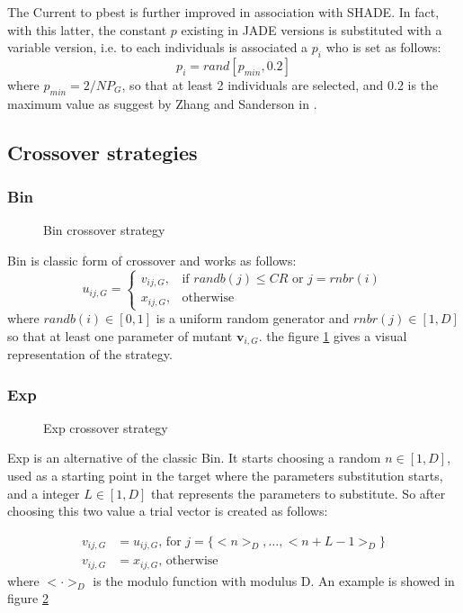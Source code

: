 The Current to pbest is further improved in association with SHADE. In fact, with this latter, the constant $p$ existing in JADE versions is substituted with a variable version, i.e. to each individuals is associated a $p_i$ who is set as follows:
\begin{equation}
p_i = rand[p_{\textit{min}}, 0.2]
\end{equation}
where $p_{\textit{min}} = 2 / \textit{NP}_G$, so that at least 2 individuals are selected, and 0.2 is the maximum value as suggest by Zhang and Sanderson in \cite{JADE:2009}.
\subsection{Crossover strategies}

\subsubsection{Bin}
\begin{figure}[h]
	\caption{Bin crossover strategy}
	\label{fig:bin-crossover}
\end{figure}
Bin is classic form of crossover and works as follows:
\begin{equation}
	u_{ij, G} = \begin{cases}
		v_{ij, G}, &\textrm{if }\textit{randb}(j) \leq \textit{CR}\textrm{ or } j = \textit{rnbr}(i)\\
		x_{ij, G}, &\textrm{otherwise}
	\end{cases}
\end{equation}
where $\textit{randb}(i) \in [0, 1]$ is a uniform random generator and $\textit{rnbr}(j) \in [1, D]$ so that at least one parameter of mutant $\textbf{v}_{i, G}$. the figure \ref{fig:bin-crossover} gives a visual representation of the strategy.
\subsubsection{Exp}
\begin{figure}[h]
	\caption{Exp crossover strategy}
	\label{fig:exp-crossover}
\end{figure}
Exp is an alternative of the classic Bin. It starts choosing a random $n \in [1, D]$, used as a starting point in the target where the parameters substitution starts, and a integer $L \in [1, D]$ that represents the parameters to substitute. So after choosing this two value a trial vector is created as follows:

\begin{align}
	v_{ij, G} &= u_{ij, G}\textrm{,  for } j = \{<n>_{D}, \dots, <n + L - 1>_{D}\} \\
	v_{ij, G} &= x_{ij, G}\textrm{,  otherwise}
\end{align} 
where $< \cdot >_{D}$ is the modulo function with modulus D. An example is showed in figure \ref{fig:exp-crossover}
